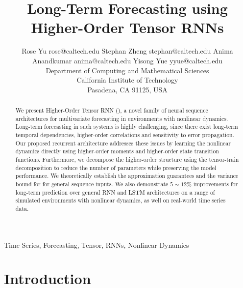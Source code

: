 \documentclass[twoside,11pt]{article}
\begin{document}
\title{Long-Term Forecasting using  Higher-Order Tensor RNNs}

\author{\name Rose Yu \email rose@caltech.edu 
       \AND
       \name Stephan Zheng \email stephan@caltech.edu 
       \AND
      \name Anima  Anandkumar \email anima@caltech.edu 
       \AND
       \name Yisong Yue \email yyue@caltech.edu \\
        \addr Department of Computing and Mathematical Sciences\\
       California Institute of Technology\\
       Pasadena, CA 91125, USA}


\maketitle

\begin{abstract}%
  We present Higher-Order Tensor RNN (\trnn{}), a novel family of neural sequence architectures for multivariate forecasting in environments with nonlinear dynamics.
  Long-term forecasting in such systems is highly challenging, since there exist long-term temporal dependencies, higher-order correlations and sensitivity to error propagation.
  Our proposed recurrent architecture addresses these issues by learning the nonlinear dynamics directly using higher-order moments and higher-order state transition functions.
  Furthermore, we decompose the higher-order structure using the tensor-train decomposition to reduce the number of parameters while preserving the model performance.
  We theoretically establish the approximation guarantees and the variance bound for \trnn{} for general sequence inputs. We also
  demonstrate $5 \sim 12\%$  improvements for long-term prediction over general RNN and LSTM architectures on a range of simulated environments with nonlinear dynamics, as well on real-world time series data.
\end{abstract}

\begin{keywords}
   Time Series, Forecasting, Tensor, RNNs, Nonlinear Dynamics
\end{keywords}


\section{Introduction}
\label{intro}

%
\end{document}
